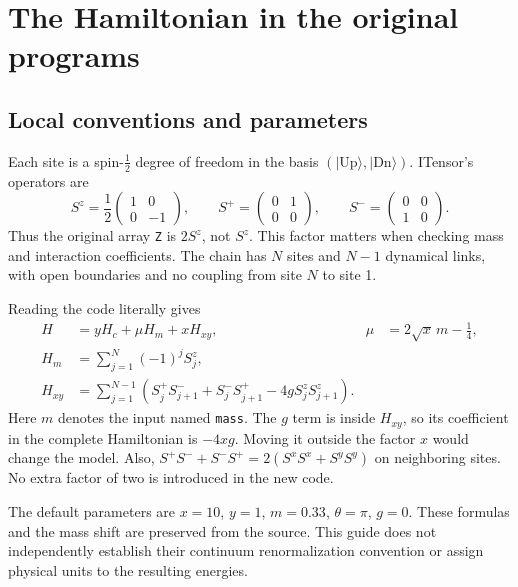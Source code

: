 \documentclass[11pt]{article}
\newcommand{\code}[1]{\nolinkurl{#1}}
\newcommand{\Sz}{S^z}
\begin{document}
\section{The Hamiltonian in the original programs}
\subsection{Local conventions and parameters}
Each site is a spin-$\tfrac12$ degree of freedom in the basis $(|\mathrm{Up}\rangle,|\mathrm{Dn}\rangle)$. ITensor's operators are
\begin{equation}
\Sz=\frac12\begin{pmatrix}1&0\\0&-1\end{pmatrix},\qquad
S^+=\begin{pmatrix}0&1\\0&0\end{pmatrix},\qquad
S^-=\begin{pmatrix}0&0\\1&0\end{pmatrix}.
\end{equation}
Thus the original array \code{Z} is $2\Sz$, not $\Sz$. This factor matters when checking mass and interaction coefficients. The chain has $N$ sites and $N-1$ dynamical links, with open boundaries and no coupling from site $N$ to site 1.

Reading the code literally gives
\begin{align}
H &= y H_c+\mu H_m+x H_{xy}, & \mu&=2\sqrt{x}\,m-\frac14,\label{eq:H}\\
H_m&=\sum_{j=1}^N(-1)^j\Sz_j,\\
H_{xy}&=\sum_{j=1}^{N-1}\left(S^+_jS^-_{j+1}+S^-_jS^+_{j+1}-4g\Sz_j\Sz_{j+1}\right).
\end{align}
Here $m$ denotes the input named \code{mass}. The $g$ term is inside $H_{xy}$, so its coefficient in the complete Hamiltonian is $-4xg$. Moving it outside the factor $x$ would change the model. Also, $S^+S^-+S^-S^+=2(S^xS^x+S^yS^y)$ on neighboring sites. No extra factor of two is introduced in the new code.

The default parameters are $x=10$, $y=1$, $m=0.33$, $\theta=\pi$, $g=0$. These formulas and the mass shift are preserved from the source. This guide does not independently establish their continuum renormalization convention or assign physical units to the resulting energies.
\end{document}
